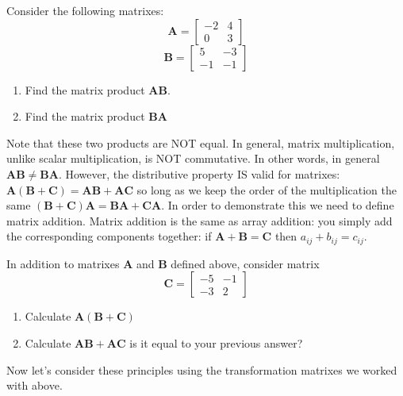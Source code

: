 \documentclass{tufte-handout}
\begin{document}
Consider the following matrixes:
\[ \mathbf{A} =
\left[\begin{array}{rr}
-2 & 4 \\
0 & 3
\end{array}\right]
\]
\[ \mathbf{B} =
\left[\begin{array}{rr}
5 & -3 \\
-1 & -1
\end{array}\right]
\]
\begin{enumerate}[resume]
\item  Find the matrix product $\mathbf{A} \mathbf{B}$.
\item  Find the matrix product $\mathbf{B} \mathbf{A}$
\end{enumerate}
Note that these two products are NOT equal.  In general, matrix multiplication, unlike scalar multiplication, is NOT commutative.  In other words, in general $\mathbf{A} \mathbf{B} \neq \mathbf{B} \mathbf{A}$.  However, the distributive property IS valid for matrixes:  $\mathbf{A} (\mathbf{B} + \mathbf{C}) = \mathbf{A} \mathbf{B} + \mathbf{A} \mathbf{C}$ so long as we keep the order of the multiplication the same $(\mathbf{B} + \mathbf{C})\mathbf{A} = \mathbf{B} \mathbf{A} + \mathbf{C} \mathbf{A}$.  In order to demonstrate this we need to define matrix addition.  Matrix addition is the same as array addition:  you simply add the corresponding components together:  if $\mathbf{A} + \mathbf{B} = \mathbf{C}$ then $a_{ij} + b_{ij} = c_{ij}$.

In addition to matrixes $\mathbf{A}$ and $ \mathbf{B}$ defined above, consider matrix
\[ \mathbf{C} =
\left[\begin{array}{rr}
-5 & -1 \\
-3 & 2
\end{array}\right]
\]

\begin{enumerate}[resume]
\item  Calculate  $\mathbf{A} (\mathbf{B} + \mathbf{C}) $
\item  Calculate  $\mathbf{A} \mathbf{B} + \mathbf{A} \mathbf{C}$  is it equal to your previous answer?
\end{enumerate}

Now let's consider these principles using the transformation matrixes we worked with above.
\end{document}
